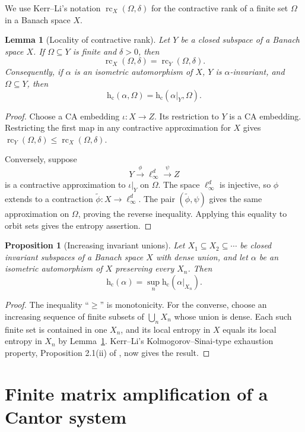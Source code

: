 \documentclass[11pt]{article}
\newtheorem{proposition}[theorem]{Proposition}
\newtheorem{lemma}[theorem]{Lemma}
\theoremstyle{remark}
\newcommand{\hc}{\mathrm{h}_{\mathrm c}}
\begin{document}
We use Kerr--Li's notation $\operatorname{rc}_X(\Omega,\delta)$ for the
contractive rank of a finite set $\Omega$ in a Banach space $X$.

\begin{lemma}[Locality of contractive rank]\label{lem:locality}
Let $Y$ be a closed subspace of a Banach space $X$.  If
$\Omega\subseteq Y$ is finite and $\delta>0$, then
\[
  \operatorname{rc}_X(\Omega,\delta)
  =\operatorname{rc}_Y(\Omega,\delta).
\]
Consequently, if $\alpha$ is an isometric automorphism of $X$, $Y$ is
$\alpha$-invariant, and $\Omega\subseteq Y$, then
\[
  \hc(\alpha,\Omega)=\hc(\alpha|_Y,\Omega).
\]
\end{lemma}

\begin{proof}
Choose a CA embedding $\iota\colon X\to Z$.  Its restriction to $Y$ is a CA
embedding.  Restricting the first map in any contractive approximation for
$X$ gives
$\operatorname{rc}_Y(\Omega,\delta)\leq
 \operatorname{rc}_X(\Omega,\delta)$.

Conversely, suppose
\[
  Y\xrightarrow{\phi}\ell_\infty^d
   \xrightarrow{\psi} Z
\]
is a contractive approximation to $\iota|_Y$ on $\Omega$.  The space
$\ell_\infty^d$ is injective, so $\phi$ extends to a contraction
$\widetilde\phi\colon X\to\ell_\infty^d$.  The pair
$(\widetilde\phi,\psi)$ gives the same approximation on $\Omega$, proving
the reverse inequality.  Applying this equality to orbit sets gives the
entropy assertion.
\end{proof}

\begin{proposition}[Increasing invariant unions]\label{prop:union}
Let $X_1\subseteq X_2\subseteq\cdots$ be closed invariant subspaces of a
Banach space $X$ with dense union, and let $\alpha$ be an isometric
automorphism of $X$ preserving every $X_n$.  Then
\[
  \hc(\alpha)=\sup_n \hc(\alpha|_{X_n}).
\]
\end{proposition}

\begin{proof}
The inequality ``$\geq$'' is monotonicity.  For the converse, choose an
increasing sequence of finite subsets of $\bigcup_nX_n$ whose union is
dense.  Each such finite set is contained in one $X_n$, and its local
entropy in $X$ equals its local entropy in $X_n$ by
Lemma~\ref{lem:locality}.  Kerr--Li's Kolmogorov--Sinai-type exhaustion
property, Proposition 2.1(ii) of \cite{KerrLi}, now gives the result.
\end{proof}

\section{Finite matrix amplification of a Cantor system}
\end{document}
